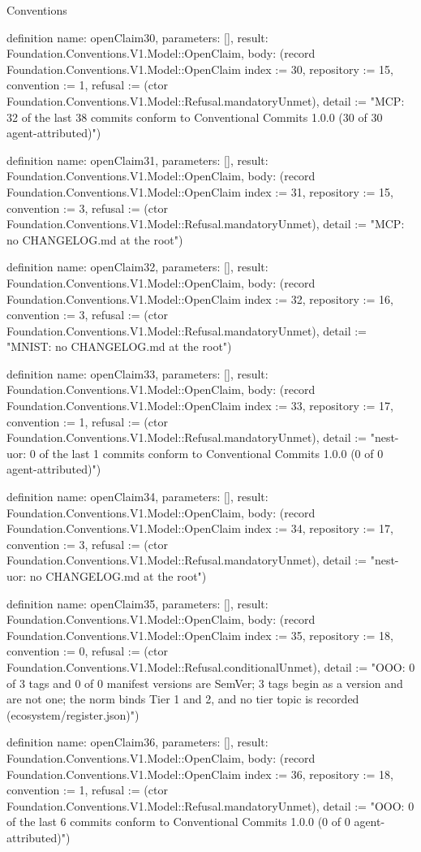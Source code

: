 \begin{lexlean}{Conventions}
\begin{semanticmodule}
definition{
  name: openClaim30,
  parameters: [],
  result: Foundation.Conventions.V1.Model::OpenClaim,
  body: (record Foundation.Conventions.V1.Model::OpenClaim {index := 30, repository := 15, convention := 1, refusal := (ctor Foundation.Conventions.V1.Model::Refusal.mandatoryUnmet), detail := "MCP: 32 of the last 38 commits conform to Conventional Commits 1.0.0 (30 of 30 agent-attributed)"})
}

definition{
  name: openClaim31,
  parameters: [],
  result: Foundation.Conventions.V1.Model::OpenClaim,
  body: (record Foundation.Conventions.V1.Model::OpenClaim {index := 31, repository := 15, convention := 3, refusal := (ctor Foundation.Conventions.V1.Model::Refusal.mandatoryUnmet), detail := "MCP: no CHANGELOG.md at the root"})
}

definition{
  name: openClaim32,
  parameters: [],
  result: Foundation.Conventions.V1.Model::OpenClaim,
  body: (record Foundation.Conventions.V1.Model::OpenClaim {index := 32, repository := 16, convention := 3, refusal := (ctor Foundation.Conventions.V1.Model::Refusal.mandatoryUnmet), detail := "MNIST: no CHANGELOG.md at the root"})
}

definition{
  name: openClaim33,
  parameters: [],
  result: Foundation.Conventions.V1.Model::OpenClaim,
  body: (record Foundation.Conventions.V1.Model::OpenClaim {index := 33, repository := 17, convention := 1, refusal := (ctor Foundation.Conventions.V1.Model::Refusal.mandatoryUnmet), detail := "nest-uor: 0 of the last 1 commits conform to Conventional Commits 1.0.0 (0 of 0 agent-attributed)"})
}

definition{
  name: openClaim34,
  parameters: [],
  result: Foundation.Conventions.V1.Model::OpenClaim,
  body: (record Foundation.Conventions.V1.Model::OpenClaim {index := 34, repository := 17, convention := 3, refusal := (ctor Foundation.Conventions.V1.Model::Refusal.mandatoryUnmet), detail := "nest-uor: no CHANGELOG.md at the root"})
}

definition{
  name: openClaim35,
  parameters: [],
  result: Foundation.Conventions.V1.Model::OpenClaim,
  body: (record Foundation.Conventions.V1.Model::OpenClaim {index := 35, repository := 18, convention := 0, refusal := (ctor Foundation.Conventions.V1.Model::Refusal.conditionalUnmet), detail := "OOO: 0 of 3 tags and 0 of 0 manifest versions are SemVer; 3 tags begin as a version and are not one; the norm binds Tier 1 and 2, and no tier topic is recorded (ecosystem/register.json)"})
}

definition{
  name: openClaim36,
  parameters: [],
  result: Foundation.Conventions.V1.Model::OpenClaim,
  body: (record Foundation.Conventions.V1.Model::OpenClaim {index := 36, repository := 18, convention := 1, refusal := (ctor Foundation.Conventions.V1.Model::Refusal.mandatoryUnmet), detail := "OOO: 0 of the last 6 commits conform to Conventional Commits 1.0.0 (0 of 0 agent-attributed)"})
}


\end{semanticmodule}
\end{lexlean}

